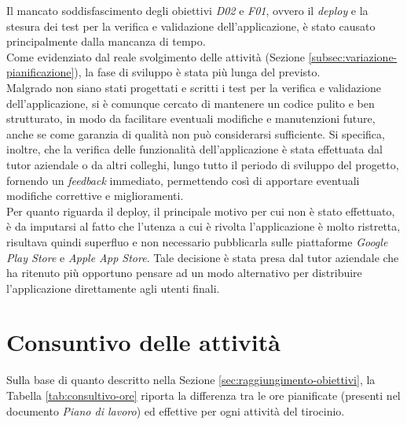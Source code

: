 \noindent Il mancato soddisfascimento degli obiettivi \emph{D02} e \emph{F01}, ovvero il \emph{deploy} e la stesura dei test per la verifica e validazione dell'applicazione, è stato causato principalmente dalla mancanza di tempo. \\
Come evidenziato dal reale svolgimento delle attività (Sezione \ref{subsec:variazione-pianificazione}), la fase di sviluppo è stata più lunga del previsto.\\
Malgrado non siano stati progettati e scritti i test per la verifica e validazione dell'applicazione, si è comunque cercato di mantenere un codice pulito e ben strutturato, in modo da facilitare eventuali modifiche e manutenzioni future, anche se come garanzia di qualità non può considerarsi sufficiente.
Si specifica, inoltre, che la verifica delle funzionalità dell'applicazione è stata effettuata dal tutor aziendale o da altri colleghi, lungo tutto il periodo di sviluppo del progetto, fornendo un \emph{feedback} immediato, permettendo così di apportare eventuali modifiche correttive e miglioramenti.\\
Per quanto riguarda il \gls{deploy}\glsoccur, il principale motivo per cui non è stato effettuato, è da imputarsi al fatto che l'utenza a cui è rivolta l'applicazione è molto ristretta, risultava quindi superfluo e non necessario pubblicarla sulle piattaforme \emph{Google Play Store} e \emph{Apple App Store}. Tale decisione è stata presa dal tutor aziendale che ha ritenuto più opportuno pensare ad un modo alternativo per distribuire l'applicazione direttamente agli utenti finali.

\section{Consuntivo delle attività}
\label{sec:consultivo-attivita}

Sulla base di quanto descritto nella Sezione \ref{sec:raggiungimento-obiettivi}, la Tabella \ref{tab:consultivo-ore} riporta la differenza tra le ore pianificate (presenti nel documento \emph{Piano di lavoro}) ed effettive per ogni attività del tirocinio.

